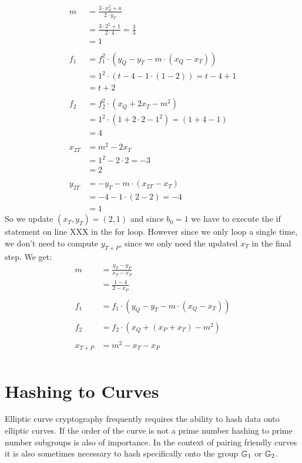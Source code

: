 \begin{example}
\begin{align*}
m & = \frac{3\cdot x_T^2 +a}{2\cdot y_T}\\
  & = \frac{3\cdot 2^2 +1}{2\cdot 4}
    = \frac{3}{3}\\
  & = 1\\
  \\
f_1 & = f_1^2\cdot (y_Q - y_T - m\cdot(x_Q-x_T)) \\
    & = 1^2\cdot (t - 4 - 1\cdot(1-2))
      = t-4+1\\
    & = t+2\\
    \\
f_2 & =  f_2^2\cdot (x_Q + 2x_T -m^2)\\
    & = 1^2\cdot (1 + 2\cdot 2 -1^2)
      = (1 + 4 -1)\\
    & = 4\\
\\
x_{2T} & =  m^2 - 2 x_T\\
       & =  1^2 - 2\cdot 2
         = -3\\
       & = 2 \\
\\
y_{2T} & = -y_T - m\cdot (x_{2T}-x_T)\\
       & = -4 - 1\cdot (2-2)
         = -4\\
       & = 1
\end{align*}
So we update $(x_T,y_T) =(2,1)$ and since $b_0=1$ we have to execute the if statement on line XXX in the for loop. However since we only loop a single time, we don't need to compute $y_{T+P}$, since we only need the updated $x_T$ in the final step. We get:
\begin{align*}
m & =  \frac{y_T -y_P}{x_T - x_P}\\
  & =  \frac{1 -4}{2 - x_P}\\
\\
f_1 & = f_1\cdot (y_Q -y_T -m\cdot (x_Q - x_T))\\
\\
f_2 & = f_2\cdot (x_Q + (x_P+x_T) - m^2)\\
\\
x_{T+P} & = m^2 -x_T -x_P\\
\end{align*}
\end{example}


\section{Hashing to Curves} Elliptic curve cryptography frequently requires the ability to hash data onto elliptic curves. If the order of the curve is not a prime number hashing to prime number subgroups is also of importance. In the context of pairing friendly curves it is also sometimes necessary to hash specifically onto the group $\mathbb{G}_1$ or $\mathbb{G}_2$.


